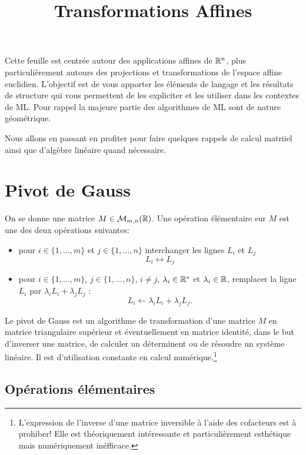 \documentclass[11pt, a4paper]{article}
\title{%
  { \huge Transformations Affines}%
}
\author{}
\date{}
\begin{document}
\maketitle\thispagestyle{fancy}

Cette feuille est centrée autour des applications affines de $\mathbb{R}^n$,
plus particulièrement autours des projections et transformations de
l'espace affine euclidien. L'objectif est de vous apporter les
éléments de langage et les résultats de structure qui vous permettent
de les expliciter et les utiliser dans les contextes de ML. Pour
rappel la majeure partie des algorithmes de ML sont de nature
géométrique.

Nous allons en passant en profiter pour faire quelques rappels de
calcul matriiel ainsi que d'algèbre linéaire quand nécessaire.

\section{Pivot de Gauss}
\label{sec:pivotGauss}

On se donne une matrice $M \in \mathcal{M}_{m, n}(\mathbb{R})$. Une opération
élémentaire sur $M$ est une des deux opérations suivantes:
\begin{itemize}
\item[\textbullet]
  pour $i \in \{1, \ldots, m\}$ et $j \in \{1, \ldots, n\}$
  interchanger les lignes $L_i$ et $L_j$
  \[
  L_i \leftrightarrow L_j
  \]
\item[\textbullet]
  pour $i \in \{1, \ldots, m\}$, $j \in \{1, \ldots, n\}$, $i \neq j$,
  $\lambda_i \in \mathbb{R}^*$ et $\lambda_i \in \mathbb{R}$, remplacer la ligne $L_i$
  par $\lambda_i L_i + \lambda_jL_j$ :
  \[
  L_i \leftarrow \lambda_iL_i + \lambda_jL_j.
  \]
\end{itemize}
Le pivot de Gauss est un algorithme de transformation d'une matrice
$M$ en matrice triangulaire supérieur et éventuellement en matrice
identité, dans le but d'inverser une matrice, de calculer un
déterminent ou de résoudre un système linéaire. Il est d'utilisation
constante en calcul numérique.\footnote{L'expression de l'inverse
  d'une matrice inversible à l'aide des cofacteurs est à prohiber!
  Elle est théoriquement intéressante et particulièrement esthétique
  mais numériquement inéfficace.}

\subsection{Opérations élémentaires}
\label{subsec:opElementaires}
\end{document}

